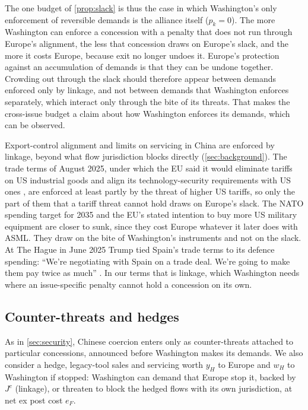The one budget of \cref{prop:slack} is thus the case in which Washington's only enforcement of reversible demands is the alliance itself ($p_k=0$). The more Washington can enforce a concession with a penalty that does not run through Europe's alignment, the less that concession draws on Europe's slack, and the more it costs Europe, because exit no longer undoes it. Europe's protection against an accumulation of demands is that they can be undone together. Crowding out through the slack should therefore appear between demands enforced only by linkage, and not between demands that Washington enforces separately, which interact only through the bite of its threats. That makes the cross-issue budget a claim about how Washington enforces its demands, which can be observed.

Export-control alignment and limits on servicing in China are enforced by linkage, beyond what flow jurisdiction blocks directly (\cref{sec:background}). The trade terms of August 2025, under which the EU said it would eliminate tariffs on US industrial goods and align its technology-security requirements with US ones \citep{whitehouse2025jointstatement}, are enforced at least partly by the threat of higher US tariffs, so only the part of them that a tariff threat cannot hold draws on Europe's slack. The NATO spending target for 2035 \citep{nato2025hague} and the EU's stated intention to buy more US military equipment \citep{whitehouse2025jointstatement} are closer to sunk, since they cost Europe whatever it later does with ASML. They draw on the bite of Washington's instruments and not on the slack. At The Hague in June 2025 Trump tied Spain's trade terms to its defence spending: ``We're negotiating with Spain on a trade deal. We're going to make them pay twice as much'' \citep{rte2025nato}. In our terms that is linkage, which Washington needs where an issue-specific penalty cannot hold a concession on its own.

\subsection{Counter-threats and hedges}\label{sec:counter}

As in \cref{sec:security}, Chinese coercion enters only as counter-threats attached to particular concessions, announced before Washington makes its demands. We also consider a hedge, legacy-tool sales and servicing worth $y_H$ to Europe and $w_H$ to Washington if stopped: Washington can demand that Europe stop it, backed by $J^c$ (linkage), or threaten to block the hedged flows with its own jurisdiction, at net ex post cost $e_F$.

